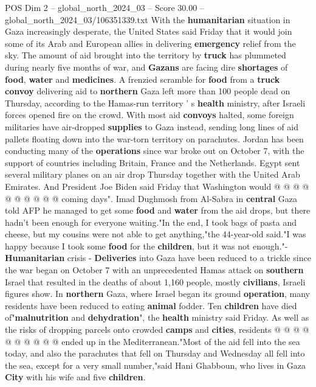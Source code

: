 \begin{textsample}{POS Dim 2 – global\_north\_2024\_03 – Score 30.00 – global\_north\_2024\_03/106351339.txt}  \label{ex:f2_pos_109}
With the \textbf{humanitarian} situation in Gaza increasingly desperate, the United States said Friday that it would join some of its Arab and European allies in delivering \textbf{emergency} relief from the sky.
The amount of aid brought into the territory by \textbf{truck} has plummeted during nearly five months of war, and \textbf{Gazans} are facing dire \textbf{shortages} of \textbf{food}, \textbf{water} and \textbf{medicines}.
A frenzied scramble for \textbf{food} from a \textbf{truck} \textbf{convoy} delivering aid to \textbf{northern} Gaza left more than 100 people dead on Thursday, according to the Hamas-run territory ' s \textbf{health} ministry, after Israeli forces opened fire on the crowd.
With most aid \textbf{convoys} halted, some foreign militaries have air-dropped \textbf{supplies} to Gaza instead, sending long lines of aid pallets floating down into the war-torn territory on parachutes.
Jordan has been conducting many of the \textbf{operations} since war broke out on October 7, with the support of countries including Britain, France and the Netherlands.
Egypt sent several military planes on an air drop Thursday together with the United Arab Emirates.
And President Joe Biden said Friday that Washington would @ @ @ @ @ @ @ @ @ @ coming days".
Imad Dughmosh from Al-Sabra in \textbf{central} Gaza told AFP he managed to get some \textbf{food} and \textbf{water} from the aid drops, but there hadn't been enough for everyone waiting."In the end, I took bags of pasta and cheese, but my cousins were not able to get anything,"the 44-year-old said."I was happy because I took some \textbf{food} for the \textbf{children}, but it was not enough."- \textbf{Humanitarian} crisis - \textbf{Deliveries} into Gaza have been reduced to a trickle since the war began on October 7 with an unprecedented Hamas attack on \textbf{southern} Israel that resulted in the deaths of about 1,160 people, mostly \textbf{civilians}, Israeli figures show.
In \textbf{northern} Gaza, where Israel began its ground \textbf{operation}, many residents have been reduced to eating \textbf{animal} fodder.
Ten \textbf{children} have died of"\textbf{malnutrition} and \textbf{dehydration}", the \textbf{health} ministry said Friday.
As well as the risks of dropping parcels onto crowded \textbf{camps} and \textbf{cities}, residents @ @ @ @ @ @ @ @ @ @ ended up in the Mediterranean."Most of the aid fell into the sea today, and also the parachutes that fell on Thursday and Wednesday all fell into the sea, except for a very small number,"said Hani Ghabboun, who lives in Gaza \textbf{City} with his wife and five \textbf{children}.

\end{textsample}
